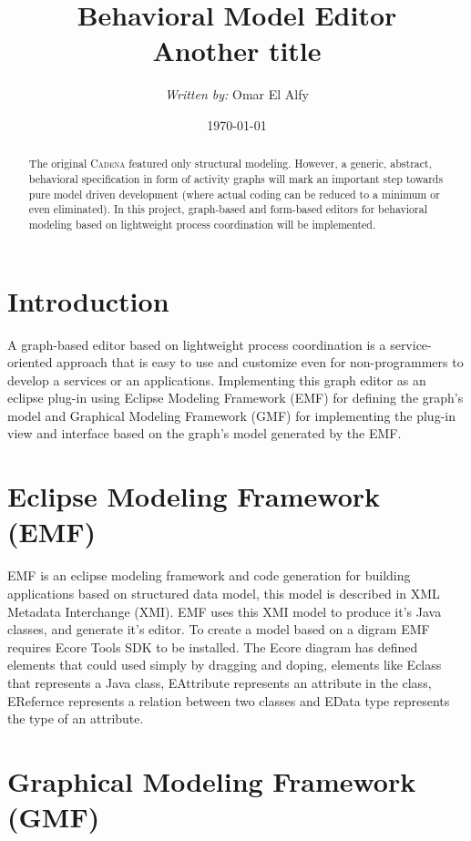 \documentclass[a4paper]{article}
\title{Behavioral Model Editor\\ {\smaller Another title}}
\author{\emph{Written by:} Omar El Alfy}
\date{\today}
\begin{document}
\maketitle



\begin{abstract}
  The original \textsc{Cadena} featured only structural
  modeling. However, a generic, abstract, behavioral specification in
  form of activity graphs will mark an important step towards pure
  model driven development (where actual coding can be reduced to a
  minimum or even eliminated). In this project, graph-based and
  form-based editors for behavioral modeling based on lightweight
  process coordination will be implemented.
\end{abstract} 



\newpage

\section{Introduction}

A graph-based editor based on lightweight process coordination is a service-oriented approach that is easy to use and customize even for non-programmers to develop a services or an applications. Implementing this graph editor as an eclipse plug-in using Eclipse Modeling Framework (EMF) for defining the graph's model and Graphical Modeling Framework (GMF) for implementing the plug-in view and interface based on the graph's model generated by the EMF.

\section{Eclipse Modeling Framework (EMF)}

EMF is an eclipse modeling framework and code generation for building applications based on structured data  model, this model is described in XML Metadata Interchange (XMI). EMF uses this XMI model to produce it's Java classes, and generate it's editor. To create a model based on a digram EMF requires Ecore Tools SDK to be installed. The Ecore diagram has defined elements that could used simply by dragging and doping, elements like Eclass that represents a Java class, EAttribute represents an attribute in the class, ERefernce represents a relation between two classes and EData type represents the type of an attribute.

\section{Graphical Modeling Framework (GMF)}
\end{document}
